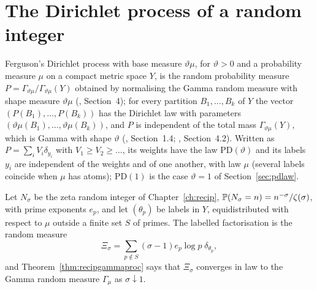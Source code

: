 \section{The Dirichlet process of a random integer}\label{sec:pddirichlet}

Ferguson's Dirichlet process with base measure $\vartheta\mu$, for $\vartheta>0$ and a probability measure $\mu$ on a compact metric space $Y$, is the random probability measure $P=\Gamma_{\vartheta\mu}/\Gamma_{\vartheta\mu}(Y)$ obtained by normalising the Gamma random measure with shape measure $\vartheta\mu$ (\cite{ferguson1973}, Section~4); for every partition $B_1,\dots,B_k$ of $Y$ the vector $(P(B_1),\dots,P(B_k))$ has the Dirichlet law with parameters $(\vartheta\mu(B_1),\dots,\vartheta\mu(B_k))$, and $P$ is independent of the total mass $\Gamma_{\vartheta\mu}(Y)$, which is Gamma with shape $\vartheta$ (\cite{jamesroynetteyor2008}, Section~1.4; \cite{pitman2006}, Section~4.2). Written as $P=\sum_iV_i\delta_{y_i}$ with $V_1\ge V_2\ge\dots$, its weights have the law $\mathrm{PD}(\vartheta)$ and its labels $y_i$ are independent of the weights and of one another, with law $\mu$ (several labels coincide when $\mu$ has atoms); $\mathrm{PD}(1)$ is the case $\vartheta=1$ of Section~\ref{sec:pdlaw}.

Let $N_\sigma$ be the zeta random integer of Chapter~\ref{ch:recip}, $\mathbb{P}(N_\sigma=n)=n^{-\sigma}/\zeta(\sigma)$, with prime exponents $e_p$, and let $(\theta_p)$ be labels in $Y$, equidistributed with respect to $\mu$ outside a finite set $S$ of primes. The labelled factorisation is the random measure
\[
\Xi_\sigma=\sum_{p\notin S}(\sigma-1)e_p\log p\;\delta_{\theta_p},
\]
and Theorem~\ref{thm:recipgammaproc} says that $\Xi_\sigma$ converges in law to the Gamma random measure $\Gamma_\mu$ as $\sigma\downarrow1$.

